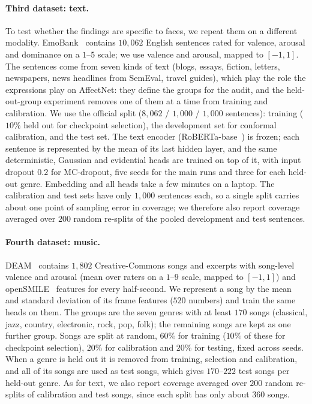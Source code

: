 \paragraph{Third dataset: text.} To test whether the findings are specific to
faces, we repeat them on a different modality. EmoBank~\cite{buechel2017emobank}
contains $10{,}062$ English sentences rated for valence, arousal and dominance
on a $1$--$5$ scale; we use valence and arousal, mapped to $[-1,1]$. The
sentences come from seven kinds of text (blogs, essays, fiction, letters,
newspapers, news headlines from SemEval, travel guides), which play the role
the expressions play on AffectNet: they define the groups for the audit, and
the held-out-group experiment removes one of them at a time from training and
calibration. We use the official split ($8{,}062$ / $1{,}000$ / $1{,}000$
sentences): training ($10\%$ held out for checkpoint selection), the
development set for conformal calibration, and the test set. The text encoder
(RoBERTa-base~\cite{liu2019roberta}) is frozen; each sentence is represented by
the mean of its last hidden layer, and the same deterministic, Gaussian and
evidential heads are trained on top of it, with input dropout $0.2$ for
MC-dropout, five seeds for the main runs and three for each held-out genre.
Embedding and all heads take a few minutes on a laptop. The calibration and test sets have
only $1{,}000$ sentences each, so a single split carries about one point of
sampling error in coverage; we therefore also report coverage averaged over
$200$ random re-splits of the pooled development and test sentences.

\paragraph{Fourth dataset: music.} DEAM~\cite{aljanaki2017deam} contains
$1{,}802$ Creative-Commons songs and excerpts with song-level valence and arousal
(mean over raters on a $1$--$9$ scale, mapped to $[-1,1]$) and
openSMILE~\cite{eyben2010opensmile} features for every half-second. We represent
a song by the mean and standard deviation of its frame features ($520$ numbers)
and train the same heads on them. The groups are the seven genres with at least
$170$ songs (classical, jazz, country, electronic, rock, pop, folk); the
remaining songs are kept as one further group. Songs are split at random,
$60\%$ for training ($10\%$ of these for checkpoint selection), $20\%$ for
calibration and $20\%$ for testing, fixed across seeds. When a genre is held
out it is removed from training, selection and calibration, and all of its
songs are used as test songs, which gives $170$--$222$ test songs per held-out
genre. As for text, we also report coverage averaged over $200$ random
re-splits of calibration and test songs, since each split has only about
$360$ songs.

